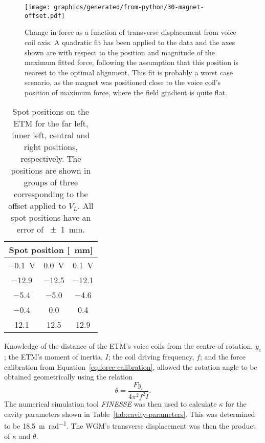 
\begin{figure}
  \centering
  \texttt{[image: graphics/generated/from-python/30-magnet-offset.pdf]}
  \caption{\label{fig:misaligned-voice-coil-results}Change in force as a function of transverse displacement from voice coil axis. A quadratic fit has been applied to the data and the axes shown are with respect to the position and magnitude of the maximum fitted force, following the assumption that this position is nearest to the optimal alignment. This fit is probably a worst case scenario, as the magnet was positioned close to the voice coil's position of maximum force, where the field gradient is quite flat. }
\end{figure}

\begin{table}
  \centering
  \begin{tabular}{|c|c|c|}
    \hline
    \multicolumn{3}{|c|}{\textbf{Spot position [\SI{}{\milli \meter}]}} \\ \hline
    \SI{-0.1}{\volt} & \SI{0.0}{\volt} & \SI{+0.1}{\volt}               \\ \hline\hline
    \num{-12.9} & \num{-12.5} & \num{-12.1}                             \\ \hline
    \num{-5.4} & \num{-5.0} & \num{-4.6}                                \\ \hline
    \num{-0.4} & \num{0.0} & \num{0.4}                                  \\ \hline
    \num{12.1} & \num{12.5} & \num{12.9}                                \\ \hline
  \end{tabular}
  \caption{\label{tab:spot-positions}Spot positions on the \gls{ETM} for the far left, inner left, central and right positions, respectively. The positions are shown in groups of three corresponding to the offset applied to $V_L$. All spot positions have an error of \SI{\pm1}{\milli\meter}.}
\end{table}

Knowledge of the distance of the \gls{ETM}'s voice coils from the centre of rotation, $y_c$; the \gls{ETM}'s moment of inertia, $I$; the coil driving frequency, $f$; and the force calibration from Equation~\ref{eq:force-calibration}, allowed the rotation angle to be obtained geometrically using the relation
\begin{equation}
  \theta = \frac{F y_c}{4 \pi^2 f^2 I}.
  \label{eq:rotation-calibration}
\end{equation}
The numerical simulation tool \emph{FINESSE} \cite{Freise2004} was then used to calculate $\kappa$ for the cavity parameters shown in Table~\ref{tab:cavity-parameters}. This was determined to be \SI{18.5}{\meter \per \radian}. The \gls{WGM}'s transverse displacement was then the product of $\kappa$ and $\theta$.


